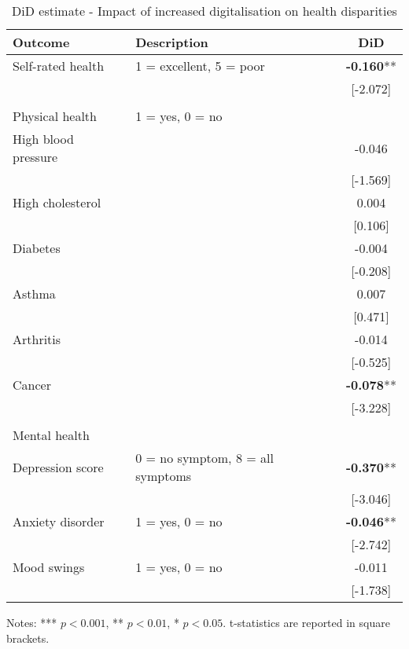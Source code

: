 \documentclass[11pt]{article}
\begin{document}
    \begin{table}[h!]
        \centering
        \caption{DiD estimate - Impact of increased digitalisation on health disparities}
        \label{tab:did}
        \begin{threeparttable}
            \begin{tabular}{llc}
                \toprule
                Outcome & Description & DiD \\
                \midrule
                Self-rated health & 1 = excellent, 5 = poor & \textbf{-0.160}** \\
                &  & [-2.072] \\
                & & \\
                Physical health & 1 = yes, 0 = no & \\
                High blood pressure &  & -0.046 \\
                &  & [-1.569] \\
                High cholesterol &  & 0.004 \\
                &  & [0.106] \\
                Diabetes &  & -0.004 \\
                &  & [-0.208] \\
                Asthma &  & 0.007 \\
                &  & [0.471] \\
                Arthritis &  & -0.014 \\
                &  & [-0.525] \\
                Cancer &  & \textbf{-0.078}** \\
                &  & [-3.228] \\
                & & \\
                Mental health & & \\
                Depression score & 0 = no symptom, 8 = all symptoms & \textbf{-0.370}** \\
                &  & [-3.046] \\
                Anxiety disorder & 1 = yes, 0 = no & \textbf{-0.046}** \\
                &  & [-2.742] \\
                Mood swings & 1 = yes, 0 = no & -0.011 \\
                &  & [-1.738] \\
                \bottomrule
            \end{tabular}
            \begin{tablenotes}
                \footnotesize
                \item Notes: *** $p < 0.001$, ** $p < 0.01$, * $p < 0.05$. t-statistics are reported in square brackets.
            \end{tablenotes}
        \end{threeparttable}
    \end{table}
\end{document}
